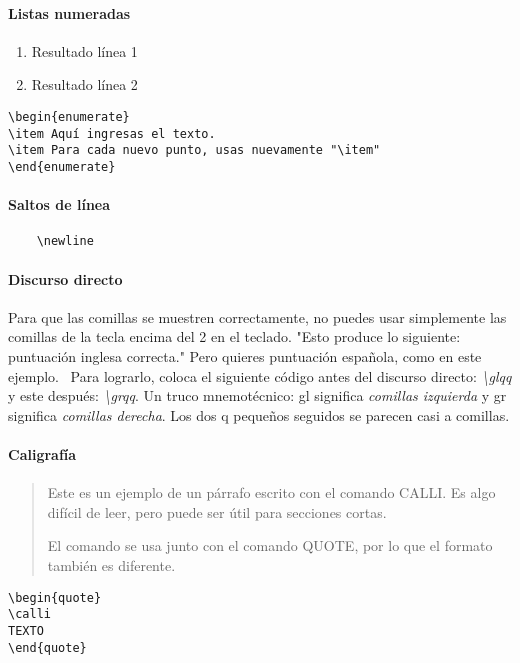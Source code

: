 \paragraph{Listas numeradas}
\begin{enumerate}
        \item Resultado línea 1
        \item Resultado línea 2
    \end{enumerate}
\begin{verbatim}\begin{enumerate}
\item Aquí ingresas el texto.
\item Para cada nuevo punto, usas nuevamente "\item"
\end{enumerate}
\end{verbatim}
\paragraph{Saltos de línea} \begin{verbatim}
    \newline
\end{verbatim}
\paragraph{Discurso directo} Para que las comillas se muestren correctamente, no puedes usar simplemente las comillas de la tecla encima del 2 en el teclado. "Esto produce lo siguiente: puntuación inglesa correcta." Pero quieres puntuación española, \glqq como en este ejemplo.\grqq~ Para lograrlo, coloca el siguiente código antes del discurso directo: \textit{\textbackslash glqq} y este después: \textit{\textbackslash grqq}. Un truco mnemotécnico: gl significa \textit{comillas izquierda} y gr significa \textit{comillas derecha}. Los dos q pequeños seguidos se parecen casi a comillas.
\paragraph{Caligrafía}
\begin{quote} \calli
Este es un ejemplo de un párrafo escrito con el comando CALLI. Es algo difícil de leer, pero puede ser útil para secciones cortas.\newline

El comando se usa junto con el comando QUOTE, por lo que el formato también es diferente.
\end{quote}
\begin{verbatim}
\begin{quote}
\calli
TEXTO
\end{quote}
\end{verbatim}

